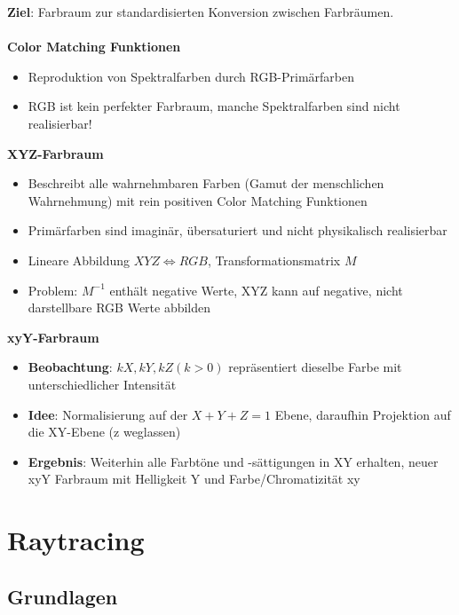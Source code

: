 \documentclass[10pt,a4paper]{article}
\begin{document}
	\textbf{Ziel}: Farbraum zur standardisierten Konversion zwischen Farbräumen.\\\\
	\textbf{Color Matching Funktionen}
		\begin{itemize}
			\item Reproduktion von Spektralfarben durch RGB-Primärfarben
			\item RGB ist kein perfekter Farbraum, manche Spektralfarben sind nicht realisierbar!
		\end{itemize}		
	\textbf{XYZ-Farbraum}
		\begin{itemize}
			\item Beschreibt alle wahrnehmbaren Farben (\glqq Gamut der menschlichen Wahrnehmung\grqq) mit rein positiven Color Matching Funktionen
			\item Primärfarben sind imaginär, übersaturiert und nicht physikalisch realisierbar
			\item Lineare Abbildung $XYZ \Leftrightarrow RGB$, Transformationsmatrix $M$
			\item Problem: $M^{-1}$ enthält negative Werte, XYZ kann auf negative, nicht darstellbare RGB Werte abbilden
		\end{itemize}
	\textbf{xyY-Farbraum}
		\begin{itemize}
			\item \textbf{Beobachtung}: $kX, kY, kZ (k > 0)$ repräsentiert dieselbe Farbe mit unterschiedlicher Intensität
			\item \textbf{Idee}: Normalisierung auf der $X + Y + Z = 1$ Ebene, daraufhin Projektion auf die XY-Ebene (z weglassen)
			\item \textbf{Ergebnis}: Weiterhin alle Farbtöne und -sättigungen in XY erhalten, neuer xyY Farbraum mit Helligkeit Y und Farbe/Chromatizität xy
		\end{itemize}

	\newpage
	\section{Raytracing}
	\label{sec:raytracing}

	\subsection{Grundlagen}
	\label{sub:grundlagen}
\end{document}
